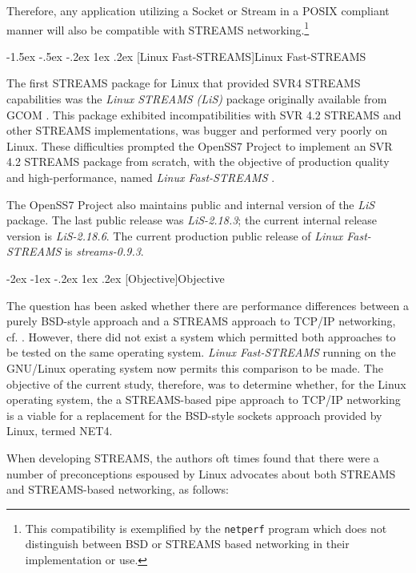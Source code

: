 \documentclass[letterpaper,final,notitlepage,twocolumn,10pt,twoside]{article}
\makeatletter
\renewcommand\section{\@startsection {section}{1}{\z@}%
                                   {-2ex \@plus -1ex \@minus -.2ex}%
                                   {1ex \@plus .2ex}%
                                   {\normalfont\large\bfseries}}
\renewcommand\subsection{\@startsection{subsection}{2}{\z@}%
                                     {-1.5ex \@plus -.5ex \@minus -.2ex}%
                                     {1ex \@plus .2ex}%
                                     {\normalfont\normalsize\bfseries}}
\makeatother
\begin{document}
Therefore, any application utilizing a Socket or Stream in a POSIX compliant
manner will also be compatible with STREAMS networking.\footnote{This
compatibility is exemplified by the \texttt{netperf} program which does not
distinguish between BSD or STREAMS based networking in their implementation or
use.}

\subsection[Linux Fast-STREAMS]{Linux Fast-STREAMS}

The first STREAMS package for Linux that provided SVR4 STREAMS capabilities
was the \textsl{Linux STREAMS (LiS)} package originally available from GCOM
\cite[]{LiS}.  This package exhibited incompatibilities with SVR 4.2 STREAMS
and other STREAMS implementations, was bugger and performed very poorly on
Linux.  These difficulties prompted the OpenSS7 Project \cite[]{openss7} to
implement an SVR 4.2 STREAMS package from scratch, with the objective of
production quality and high-performance, named \textsl{Linux Fast-STREAMS}
\cite[]{LfS}.

The OpenSS7 Project also maintains public and internal version of the
\textsl{LiS} package.  The last public release was \textit{LiS-2.18.3}; the
current internal release version is \textit{LiS-2.18.6}.  The current
production public release of \textsl{Linux Fast-STREAMS} is
\textit{streams-0.9.3}.

\section[Objective]{Objective}

The question has been asked whether there are performance differences between
a purely BSD-style approach and a STREAMS approach to TCP/IP networking, cf.
\cite[]{demux}.  However, there did not exist a system which permitted both
approaches to be tested on the same operating system.  \textsl{Linux
Fast-STREAMS} running on the GNU/Linux operating system now permits this
comparison to be made.  The objective of the current study, therefore, was to
determine whether, for the Linux operating system, the a STREAMS-based pipe
approach to TCP/IP networking is a viable for a replacement for the BSD-style
sockets approach provided by Linux, termed NET4.

When developing STREAMS, the authors oft times found that there were a number
of preconceptions espoused by Linux advocates about both STREAMS and
STREAMS-based networking, as follows:
\end{document}
